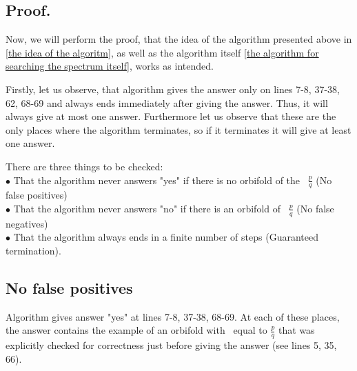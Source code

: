 \subsection{Proof.}\label{proof of the correctness of the algorithm}
Now, we will perform the proof, that the idea of the algorithm presented above in 
\ref{the idea of the algoritm}, as 
well as the algorithm itself \ref{the algorithm for searching the spectrum itself}, 
works as intended.

Firstly, let us observe, that algorithm gives the answer only on lines 7-8, 37-38, 62, 68-69 and 
always ends immediately after giving the answer. Thus, it will always give at most one answer.
Furthermore let us observe that these are the only places where the algorithm terminates, 
so if it terminates it will give at least one answer.
 
There are three things to be checked: \\
$\bullet$ That the algorithm never answers "yes" if there is no orbifold of the \Eoc\ 
$\frac{p}{q}$ (No false positives)\\
$\bullet$ That the algorithm never answers "no" if there is an orbifold of \Eoc\ 
$\frac{p}{q}$ (No false negatives)\\ 
$\bullet$ That the algorithm always ends in a finite number of steps (Guaranteed termination). 








\subsection{No false positives}
Algorithm gives answer "yes" at lines 7-8, 37-38, 68-69. At each of these places, 
the answer contains the example of an orbifold with \Eoc\ equal to $\frac{p}{q}$ that was 
explicitly checked for correctness just before giving the answer (see lines 5, 35, 66). 
